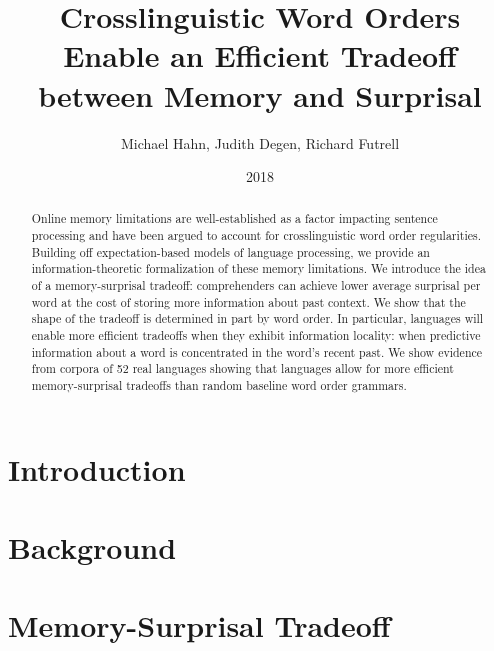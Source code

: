 \documentclass[11pt,letterpaper]{article}
\title{Crosslinguistic Word Orders Enable an Efficient Tradeoff between Memory and Surprisal}
\author{Michael Hahn, Judith Degen, Richard Futrell}
\date{2018}
\begin{document}
\maketitle


\begin{abstract}
Online memory limitations are well-established as a factor impacting sentence processing and have been argued to account for crosslinguistic word order regularities. Building off expectation-based models of language processing, we provide an information-theoretic formalization of these memory limitations. We introduce the idea of a memory-surprisal tradeoff: comprehenders can achieve lower average surprisal per word at the cost of storing more information about past context. We show that the shape of the tradeoff is determined in part by word order. In particular, languages will enable more efficient tradeoffs when they exhibit information locality: when predictive information about a word is concentrated in the word’s recent past. We show evidence from corpora of 52 real languages showing that languages allow for more efficient memory-surprisal tradeoffs than random baseline word order grammars. 
\end{abstract}


% 


 
\section{Introduction}





\section{Background}\label{sec:background}




\section{Memory-Surprisal Tradeoff}\label{sec:ms-tradeoff}
\end{document}
